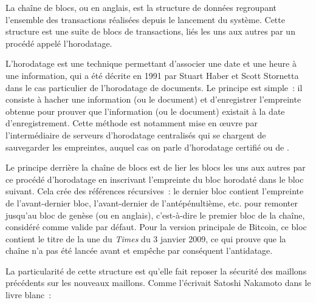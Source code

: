 La chaîne de blocs, ou  en anglais, est la structure de données regroupant l'ensemble des transactions réalisées depuis le lancement du système. Cette structure est une suite de blocs de transactions, liés les uns aux autres par un procédé appelé l'horodatage.


L'horodatage est une technique permettant d'associer une date et une heure à une information, qui a été décrite en 1991 par Stuart Haber et Scott Stornetta dans le cas particulier de l'horodatage de documents. Le principe est simple~: il consiste à hacher une information (ou le document) et d'enregistrer l'empreinte obtenue pour prouver que l'information (ou le document) existait à la date d'enregistrement. Cette méthode est notamment mise en œuvre par l'intermédiaire de serveurs d'horodatage centralisés qui se chargent de sauvegarder les empreintes, auquel cas on parle d'horodatage certifié ou de .

Le principe derrière la chaîne de blocs est de lier les blocs les uns aux autres par ce procédé d'horodatage en inscrivant l'empreinte du bloc horodaté dans le bloc suivant. Cela crée des références récursives~: le dernier bloc contient l'empreinte de l'avant-dernier bloc, l'avant-dernier de l'antépénultième, etc. pour remonter jusqu'au bloc de genèse (ou  en anglais), c'est-à-dire le premier bloc de la chaîne, considéré comme valide par défaut. Pour la version principale de Bitcoin, ce bloc contient le titre de la une du \emph{Times} du 3 janvier 2009, ce qui prouve que la chaîne n'a pas été lancée avant et empêche par conséquent l'antidatage.

La particularité de cette structure est qu'elle fait reposer la sécurité des maillons précédents sur les nouveaux maillons. Comme l'écrivait Satoshi Nakamoto dans le livre blanc~: 

